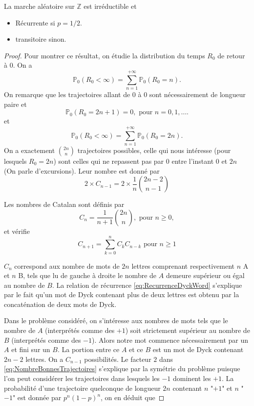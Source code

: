 \begin{theo}
La marche aléatoire sur $\mathbb{Z}$ est irréductible et
\begin{itemize}
\item Récurrente si $p=1/2$.
\item transitoire sinon.
\end{itemize}
\end{theo}
\begin{proof}
Pour montrer ce résultat, on étudie la distribution du temps $R_0$ de retour à $0$. On a
$$
\mathbb{P}_0(R_0<\infty)=\sum_{n=1}^{+\infty}\mathbb{P}_0(R_0=n).
$$
On remarque que les trajectoires allant de $0$ à $0$ sont nécessairement de longueur paire et
$$
\mathbb{P}_0(R_0=2n+1)=0,\text{ pour } n=0,1,\ldots.
$$
et
$$
\mathbb{P}_0(R_0<\infty)=\sum_{n=1}^{+\infty}\mathbb{P}_0(R_0=2n).
$$
On a exactement $\binom{2n}{n}$ trajectoires possibles, celle qui nous intéresse (pour lesquels $R_0=2n$) sont celles qui ne repassent pas par $0$ entre l'instant $0$ et $2n$ (On parle d'excursions). Leur nombre est donné par
\begin{equation}\label{eq:NombreBonnesTrajectoires}
2\times C_{n-1}=2\times \frac{1}{n}\binom{2n-2}{n-1}
\end{equation}
\begin{definition}
Les nombres de Catalan sont définis par
$$
C_n=\frac{1}{n+1}\binom{2n}{n},\text{ pour }n\geq 0,
$$
et vérifie
\begin{equation}\label{eq:RecurrenceDyckWord}
C_{n+1}=\sum_{k=0}^{n}C_kC_{n-k}\text{ pour }n\geq1
\end{equation}
\end{definition}
\begin{ex}
$C_n$ correspond aux nombre de mots de $2n$ lettres comprenant respectivement $n$ A et $n$ B, tels que lu de gauche à droite le nombre de $A$ demeure supérieur ou égal au nombre de $B$. La relation de récurrence \eqref{eq:RecurrenceDyckWord} s'explique par le fait qu'un mot de Dyck contenant plus de deux lettres est obtenu par la concaténation de deux mots de Dyck.
\end{ex}
Dans le problème considéré, on s'intéresse aux nombres de mots tels que le nombre de $A$ (interprétés comme des $+1$) soit strictement supérieur au nombre de $B$ (interprétés comme des $-1$). Alors notre mot commence nécessairement par un $A$ et fini sur un $B$. La portion entre ce $A$ et ce $B$ est un mot de Dyck contenant $2n-2$ lettres. On a $C_{n-1}$ possibilités. Le facteur $2$ dans \eqref{eq:NombreBonnesTrajectoires} s'explique par la symétrie du problème puisque l'on peut considérer les trajectoires dans lesquels les $-1$ dominent les $+1$. La probabilité d'une trajectoire quelconque de longueur $2n$ contenant $n$ "$+1$" et $n$ "$-1$" est donnée par $p^{n}(1-p)^{n}$, on en déduit que

\end{proof}
